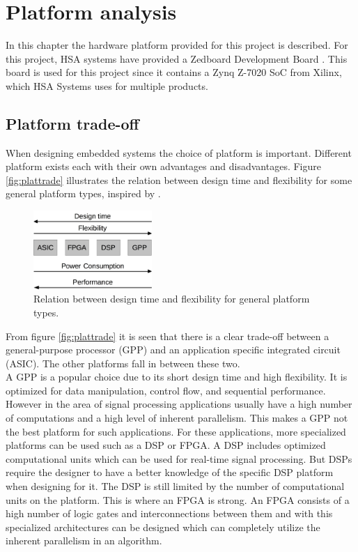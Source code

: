 \chapter{Platform analysis} \label{ch:plaanalysis}
In this chapter the hardware platform provided for this project is described. For this project, HSA systems have provided a Zedboard Development Board \cite{Zedboard2014}. This board is used for this project since it contains a Zynq Z-7020 SoC from Xilinx, which HSA Systems uses for multiple products.

\section{Platform trade-off}
When designing embedded systems the choice of platform is important. Different platform exists each with their own advantages and disadvantages. Figure \vref{fig:plattrade} illustrates the relation between design time and flexibility for some general platform types, inspired by \cite{adams2002choosing}. \\

\begin{figure}[ht!]
  \centering
  \includegraphics[width=0.4\textwidth]{figures/plattrade3}
  \caption{Relation between design time and flexibility for general platform types.}
  \label{fig:plattrade}
\end{figure}
From figure \vref{fig:plattrade} it is seen that there is a clear trade-off between a general-purpose processor (GPP) and an application specific integrated circuit (ASIC). The other platforms fall in between these two.\\

A GPP is a popular choice due to its short design time and high flexibility. It is optimized for data manipulation, control flow, and sequential performance. However in the area of signal processing applications usually have a high number of computations and a high level of inherent parallelism. This makes a GPP not the best platform for such applications. For these applications, more specialized platforms can be used such as a DSP or FPGA. A DSP includes optimized computational units which can be used for real-time signal processing. But DSPs require the designer to have a better knowledge of the specific DSP platform when designing for it. The DSP is still limited by the number of computational units on the platform. This is where an FPGA is strong. An FPGA consists of a high number of logic gates and interconnections between them and with this specialized architectures can be designed which can completely utilize the inherent parallelism in an algorithm.\\ 

